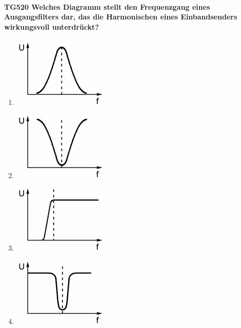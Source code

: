 \documentclass[8pt]{article}
\begin{document}
\paragraph*{TG520 Welches Diagramm stellt den Frequenzgang eines Ausgangsfilters dar, das die Harmonischen eines Einbandsenders wirkungsvoll unterdrückt?}
\begin{enumerate}[nolistsep,label=\Alph*]
\item
\begin{center}
	\begin{minipage}{\linewidth}
		\centering
		\includegraphics[scale=1.0]{pics/tg520_a.jpg}
	\end{minipage}
\end{center}
\item
\begin{center}
	\begin{minipage}{\linewidth}
		\centering
		\includegraphics[scale=1.0]{pics/tg520_b.jpg}
	\end{minipage}
\end{center}
\item
\begin{center}
	\begin{minipage}{\linewidth}
		\centering
		\includegraphics[scale=1.0]{pics/tg520_c.jpg}
	\end{minipage}
\end{center}
\item
\begin{center}
	\begin{minipage}{\linewidth}
		\centering
		\includegraphics[scale=1.0]{pics/tg520_d.jpg}
	\end{minipage}
\end{center}
\end{enumerate}
\end{document}
